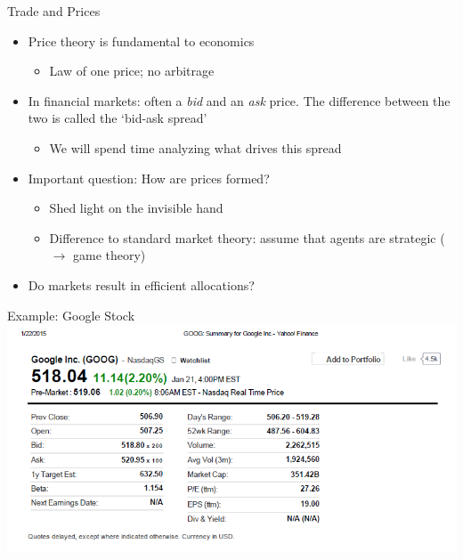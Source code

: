 \begin{frame}[label=main2]{Trade and Prices}
\begin{itemize}
	\item Price theory is fundamental to economics
	\begin{itemize}
		\item Law of one price; no arbitrage
	\end{itemize}
	\item In financial markets: often a \textit{bid} and an \textit{ask} price. The difference between the two is called the `bid-ask spread' \hyperlink{bidask}{}
	\begin{itemize}
		\item We will spend time analyzing what drives this spread
	\end{itemize}
	\item Important question: How are prices formed?
	\begin{itemize}
		\item Shed light on the invisible hand
		\item Difference to standard market theory: assume that agents are strategic ($\rightarrow$ game theory) 
	\end{itemize}
	\item Do markets result in efficient allocations?
\end{itemize}
\end{frame}


\begin{frame}{Example: Google Stock}
\includegraphics[width=1\linewidth]{pics/StockSummary_Google}
\end{frame}


